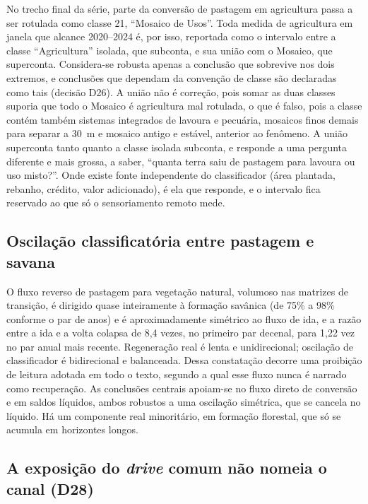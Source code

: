 No trecho final da série, parte da conversão de pastagem em agricultura passa
a ser rotulada como classe 21, ``Mosaico de Usos''. Toda medida de agricultura
em janela que alcance 2020--2024 é, por isso, reportada como o intervalo entre
a classe ``Agricultura'' isolada, que subconta, e sua união com o Mosaico, que
superconta. Considera-se robusta apenas a conclusão que sobrevive nos dois
extremos, e conclusões que dependam da convenção de classe são declaradas como
tais (decisão D26). A união não é correção, pois somar as duas classes suporia que
todo o Mosaico é agricultura mal rotulada, o que é falso, pois a classe contém
também sistemas integrados de lavoura e pecuária, mosaicos finos demais para
separar a 30~m e mosaico antigo e estável, anterior ao fenômeno. A união
superconta tanto quanto a classe isolada subconta, e responde a uma pergunta
diferente e mais grossa, a saber, ``quanta terra saiu de pastagem para lavoura
ou uso misto?''. Onde existe fonte independente do classificador (área
plantada, rebanho, crédito, valor adicionado), é ela que responde, e o
intervalo fica reservado ao que só o sensoriamento remoto mede.

\subsection{Oscilação classificatória entre pastagem e savana}
\label{sec:met-oscilacao}

O fluxo reverso de pastagem para vegetação natural, volumoso nas matrizes de
transição, é dirigido quase inteiramente à formação savânica (de 75\% a 98\%
conforme o par de anos) e é aproximadamente simétrico ao fluxo de ida, e a razão
entre a ida e a volta colapsa de 8,4 vezes, no primeiro par decenal, para 1,22
vez no par anual mais recente. Regeneração real é lenta e unidirecional;
oscilação de classificador é bidirecional e balanceada. Dessa constatação
decorre uma proibição de leitura adotada em todo o texto, segundo a qual esse
fluxo nunca é narrado como recuperação. As conclusões centrais apoiam-se no fluxo direto de
conversão e em saldos líquidos, ambos robustos a uma oscilação simétrica, que
se cancela no líquido. Há um componente real minoritário, em formação
florestal, que só se acumula em horizontes longos.

\subsection{A exposição do \emph{drive} comum não nomeia o canal (D28)}
\label{sec:met-d28}

